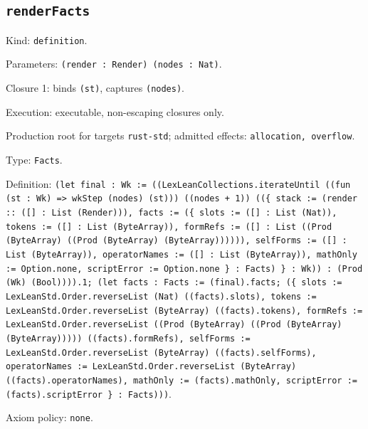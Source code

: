 \documentclass[11pt]{article}
\begin{document}
\subsection*{\texttt{renderFacts}}
\noindent Kind: \texttt{definition}.\par
\noindent Parameters: \texttt{(render : Render) (nodes : Nat)}.\par
\noindent Closure 1: binds \texttt{(st)}, captures \texttt{(nodes)}.\par
\noindent Execution: executable, non-escaping closures only.\par
\noindent Production root for targets \texttt{rust-std}; admitted effects: \texttt{allocation, overflow}.\par
\noindent Type: \texttt{Facts}.\par
\noindent Definition: \texttt{(let final : Wk := ((LexLeanCollections.iterateUntil ((fun (st : Wk) => wkStep (nodes) (st))) ((nodes + 1)) ((\{ stack := (render :: ([] : List (Render))), facts := (\{ slots := ([] : List (Nat)), tokens := ([] : List (ByteArray)), formRefs := ([] : List ((Prod (ByteArray) ((Prod (ByteArray) (ByteArray)))))), selfForms := ([] : List (ByteArray)), operatorNames := ([] : List (ByteArray)), mathOnly := Option.none, scriptError := Option.none \} : Facts) \} : Wk)) : (Prod (Wk) (Bool)))).1; (let facts : Facts := (final).facts; (\{ slots := LexLeanStd.Order.reverseList (Nat) ((facts).slots), tokens := LexLeanStd.Order.reverseList (ByteArray) ((facts).tokens), formRefs := LexLeanStd.Order.reverseList ((Prod (ByteArray) ((Prod (ByteArray) (ByteArray))))) ((facts).formRefs), selfForms := LexLeanStd.Order.reverseList (ByteArray) ((facts).selfForms), operatorNames := LexLeanStd.Order.reverseList (ByteArray) ((facts).operatorNames), mathOnly := (facts).mathOnly, scriptError := (facts).scriptError \} : Facts)))}.\par
\noindent Axiom policy: \texttt{none}.\par
\end{document}
